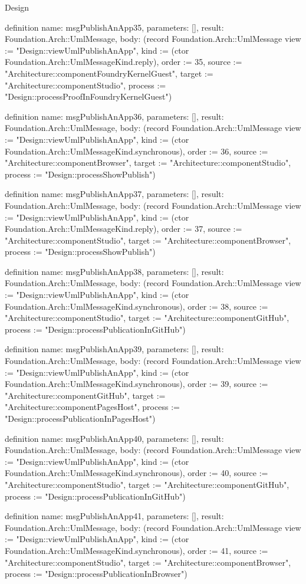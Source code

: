 \begin{lexlean}{Design}
\begin{semanticmodule}
definition{
  name: msgPublishAnApp35,
  parameters: [],
  result: Foundation.Arch::UmlMessage,
  body: (record Foundation.Arch::UmlMessage {view := "Design::viewUmlPublishAnApp", kind := (ctor Foundation.Arch::UmlMessageKind.reply), order := 35, source := "Architecture::componentFoundryKernelGuest", target := "Architecture::componentStudio", process := "Design::processProofInFoundryKernelGuest"})
}

definition{
  name: msgPublishAnApp36,
  parameters: [],
  result: Foundation.Arch::UmlMessage,
  body: (record Foundation.Arch::UmlMessage {view := "Design::viewUmlPublishAnApp", kind := (ctor Foundation.Arch::UmlMessageKind.synchronous), order := 36, source := "Architecture::componentBrowser", target := "Architecture::componentStudio", process := "Design::processShowPublish"})
}

definition{
  name: msgPublishAnApp37,
  parameters: [],
  result: Foundation.Arch::UmlMessage,
  body: (record Foundation.Arch::UmlMessage {view := "Design::viewUmlPublishAnApp", kind := (ctor Foundation.Arch::UmlMessageKind.reply), order := 37, source := "Architecture::componentStudio", target := "Architecture::componentBrowser", process := "Design::processShowPublish"})
}

definition{
  name: msgPublishAnApp38,
  parameters: [],
  result: Foundation.Arch::UmlMessage,
  body: (record Foundation.Arch::UmlMessage {view := "Design::viewUmlPublishAnApp", kind := (ctor Foundation.Arch::UmlMessageKind.synchronous), order := 38, source := "Architecture::componentStudio", target := "Architecture::componentGitHub", process := "Design::processPublicationInGitHub"})
}

definition{
  name: msgPublishAnApp39,
  parameters: [],
  result: Foundation.Arch::UmlMessage,
  body: (record Foundation.Arch::UmlMessage {view := "Design::viewUmlPublishAnApp", kind := (ctor Foundation.Arch::UmlMessageKind.synchronous), order := 39, source := "Architecture::componentGitHub", target := "Architecture::componentPagesHost", process := "Design::processPublicationInPagesHost"})
}

definition{
  name: msgPublishAnApp40,
  parameters: [],
  result: Foundation.Arch::UmlMessage,
  body: (record Foundation.Arch::UmlMessage {view := "Design::viewUmlPublishAnApp", kind := (ctor Foundation.Arch::UmlMessageKind.synchronous), order := 40, source := "Architecture::componentStudio", target := "Architecture::componentGitHub", process := "Design::processPublicationInGitHub"})
}

definition{
  name: msgPublishAnApp41,
  parameters: [],
  result: Foundation.Arch::UmlMessage,
  body: (record Foundation.Arch::UmlMessage {view := "Design::viewUmlPublishAnApp", kind := (ctor Foundation.Arch::UmlMessageKind.synchronous), order := 41, source := "Architecture::componentStudio", target := "Architecture::componentBrowser", process := "Design::processPublicationInBrowser"})
}


\end{semanticmodule}
\end{lexlean}
